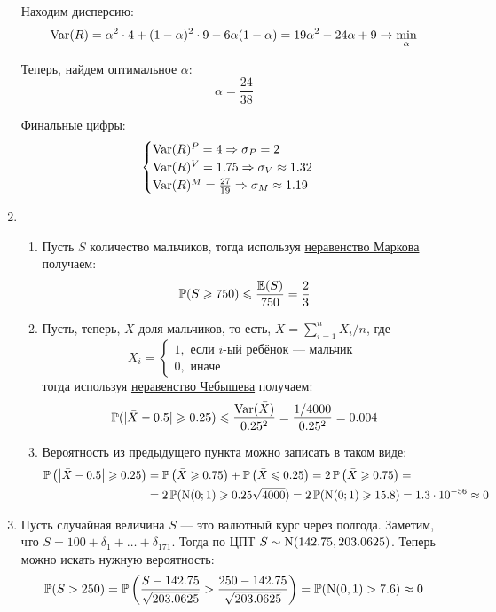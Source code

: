 \begin{enumerate}
Находим дисперсию:
\[
\operatorname{Var}(R) = \alpha^2 \cdot 4 + (1-\alpha)^2 \cdot 9 - 6\alpha (1-\alpha) = 19\alpha^2 -24\alpha + 9 \to \min_{\alpha}
\]

Теперь, найдем оптимальное $\alpha$:
\[
\alpha = \frac{24}{38}
\]

Финальные цифры:
\[
\begin{cases}
\operatorname{Var}(R)^{P} = 4 \Rightarrow \sigma_{P} = 2 \\
\operatorname{Var}(R)^{V} = 1.75 \Rightarrow \sigma_{V} \approx 1.32 \\
\operatorname{Var}(R)^{M} = \frac{27}{19} \Rightarrow \sigma_{M} \approx 1.19 \\
\end{cases}
\]
\item
\begin{enumerate}
\item Пусть $S$ количество мальчиков, тогда используя \href{https://en.wikipedia.org/wiki/Markov%27s_inequality}{неравенство Маркова} получаем:
\[
\operatorname{\mathbb{P}}(S \geqslant 750) \leqslant \frac{\operatorname{\mathbb{E}}(S)}{750} = \frac{2}{3}
\]
\item Пусть, теперь, $\bar{X}$ доля мальчиков, то есть, $\bar{X} = \sum_{i=1}^n X_i /n$, где
\[
X_i =
\begin{cases}
1, \text{ если }i\text{-ый ребёнок — мальчик }\\
0, \text{ иначе }
\end{cases}
\]
тогда используя \href{https://en.wikipedia.org/wiki/Markov%27s_inequality}{неравенство Чебышева} получаем:
\[
\operatorname{\mathbb{P}}(|\bar{X} - 0.5| \geqslant 0.25) \leqslant \frac{\operatorname{Var}(\bar{X})}{0.25^2} = \frac{1/4000}{0.25^2} = 0.004
\]
\item Вероятность из предыдущего пункта можно записать в таком виде:
\begin{align*}
\operatorname{\mathbb{P}}\left(\left|\bar{X} - 0.5\right| \geqslant 0.25\right) &= \operatorname{\mathbb{P}}\left(\bar{X} \geqslant 0.75\right) + \operatorname{\mathbb{P}}\left(\bar{X} \leqslant 0.25\right) = 2\operatorname{\mathbb{P}}\left(\bar{X} \geqslant 0.75\right) = \\
&= 2\operatorname{\mathbb{P}}(\mathrm{N}(0;1)\geqslant 0.25\sqrt{4000})=2\operatorname{\mathbb{P}}(\mathrm{N}(0;1)\geqslant 15.8) = 1.3 \cdot 10^{-56} \approx 0
\end{align*}
\end{enumerate}
\item Пусть случайная величина $S$ —  это валютный курс через полгода. Заметим, что $S = 100 + \delta_1 + \ldots + \delta_{171}$.
Тогда по ЦПТ $S \sim \mathrm{N}(142.75, 203.0625)$. Теперь можно искать нужную вероятность:
\[
\operatorname{\mathbb{P}}(S > 250) = \operatorname{\mathbb{P}} \left(\frac{S -  142.75}{\sqrt{203.0625}} > \frac{250-142.75}{\sqrt{203.0625}} \right) = \operatorname{\mathbb{P}}(\mathrm{N}(0, 1) > 7.6) \approx 0
\]
\end{enumerate}



